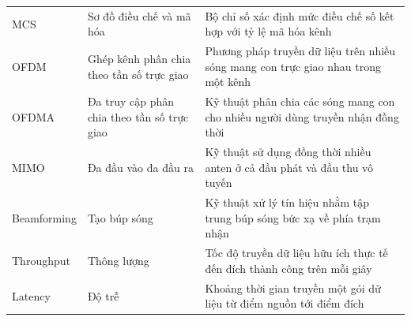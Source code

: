 \begin{xltabular}{\linewidth}{@{} L{0.8} L{0.8} L{1.4} @{}}
  MCS & Sơ đồ điều chế và mã hóa & Bộ chỉ số xác định mức điều chế số kết hợp với tỷ lệ mã hóa kênh\\
  OFDM & Ghép kênh phân chia theo tần số trực giao & Phương pháp truyền dữ liệu trên nhiều sóng mang con trực giao nhau trong một kênh\\
  OFDMA & Đa truy cập phân chia theo tần số trực giao & Kỹ thuật phân chia các sóng mang con cho nhiều người dùng truyền nhận đồng thời\\
  MIMO & Đa đầu vào đa đầu ra & Kỹ thuật sử dụng đồng thời nhiều anten ở cả đầu phát và đầu thu vô tuyến\\
  Beamforming & Tạo búp sóng & Kỹ thuật xử lý tín hiệu nhằm tập trung búp sóng bức xạ về phía trạm nhận\\
  Throughput & Thông lượng & Tốc độ truyền dữ liệu hữu ích thực tế đến đích thành công trên mỗi giây\\
  Latency & Độ trễ & Khoảng thời gian truyền một gói dữ liệu từ điểm nguồn tới điểm đích\\


\end{xltabular}
